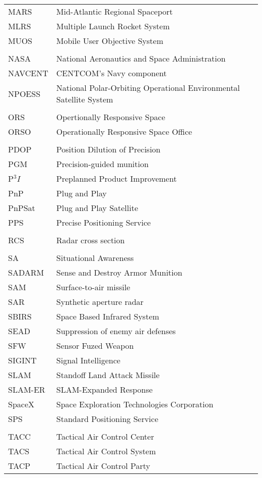 \begin{supertabular}{ll}
MARS & Mid-Atlantic Regional Spaceport \\
MLRS & Multiple Launch Rocket System \\
MUOS & Mobile User Objective System \\
\\
NASA & National Aeronautics and Space Administration \\
NAVCENT & CENTCOM's Navy component \\
NPOESS & National Polar-Orbiting Operational Environmental Satellite System \\
\\
ORS & Opertionally Responsive Space \\
ORSO & Operationally Responsive Space Office \\
\\
PDOP & Position Dilution of Precision \\
PGM & Precision-guided munition \\
P$^{3}I$ & Preplanned Product Improvement \\
PnP & Plug and Play \\
PnPSat & Plug and Play Satellite \\
PPS & Precise Positioning Service \\
\\
RCS & Radar cross section \\
\\
SA & Situational Awareness \\
SADARM & Sense and Destroy Armor Munition \\
SAM & Surface-to-air missile \\
SAR & Synthetic aperture radar \\
SBIRS & Space Based Infrared System \\
SEAD & Suppression of enemy air defenses \\
SFW & Sensor Fuzed Weapon \\
SIGINT & Signal Intelligence \\
SLAM & Standoff Land Attack Missile \\
SLAM-ER & SLAM-Expanded Response \\
SpaceX & Space Exploration Technologies Corporation \\
SPS & Standard Positioning Service \\
\\
TACC & Tactical Air Control Center \\
TACS & Tactical Air Control System \\
TACP & Tactical Air Control Party \\

\end{supertabular}
